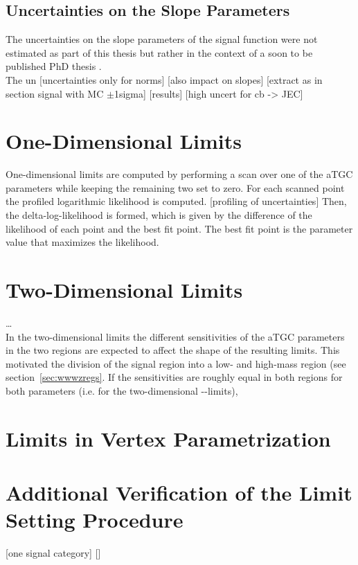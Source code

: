 \subsection{Uncertainties on the Slope Parameters}
\label{sec:uncslopesig}
The uncertainties on the slope parameters of the signal function were not estimated as part of this thesis but rather in the context of a soon to be published PhD thesis \cite{IVAN}.\\

\noindent The un
[uncertainties only for norms]
[also impact on slopes]
[extract as in section signal with MC $\pm$1sigma]
[results]
[high uncert for cb -> JEC]


\section{One-Dimensional Limits}
One-dimensional limits are computed by performing a scan over one of the aTGC parameters while keeping the remaining two set to zero. For each scanned point the profiled logarithmic likelihood is computed.
[profiling of uncertainties]
Then, the delta-log-likelihood is formed, which is given by the difference of the likelihood of each point and the best fit point. The best fit point is the parameter value that maximizes the likelihood. 


\section{Two-Dimensional Limits}
\label{sec:2dlims}
\dots \\
\noindent In the two-dimensional limits the different sensitivities of the aTGC parameters in the two regions are expected to affect the shape of the resulting limits. This motivated the division of the signal region into a low- and high-mass region (see section~\ref{sec:wwwzregs}. If the sensitivities are roughly equal in both regions for both parameters (i.e. for the two-dimensional \Tcwww -\Tccw -limits), 


\section{Limits in Vertex Parametrization}
\label{sec:vertex}


\section{Additional Verification of the Limit Setting Procedure}
[one signal category]
[]
